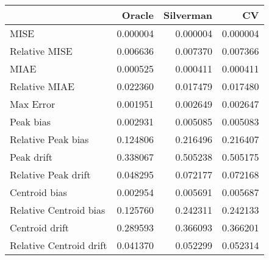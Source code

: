\begin{tabular}{lrrr}
  \hline
 & Oracle & Silverman & CV \\ 
  \hline
MISE & 0.000004 & 0.000004 & 0.000004 \\ 
  Relative MISE & 0.006636 & 0.007370 & 0.007366 \\ 
  MIAE & 0.000525 & 0.000411 & 0.000411 \\ 
  Relative MIAE & 0.022360 & 0.017479 & 0.017480 \\ 
  Max Error & 0.001951 & 0.002649 & 0.002647 \\ 
  Peak bias & 0.002931 & 0.005085 & 0.005083 \\ 
  Relative Peak bias & 0.124806 & 0.216496 & 0.216407 \\ 
  Peak drift & 0.338067 & 0.505238 & 0.505175 \\ 
  Relative Peak drift & 0.048295 & 0.072177 & 0.072168 \\ 
  Centroid bias & 0.002954 & 0.005691 & 0.005687 \\ 
  Relative Centroid bias & 0.125760 & 0.242311 & 0.242133 \\ 
  Centroid drift & 0.289593 & 0.366093 & 0.366201 \\ 
  Relative Centroid drift & 0.041370 & 0.052299 & 0.052314 \\ 
   \hline
\end{tabular}
